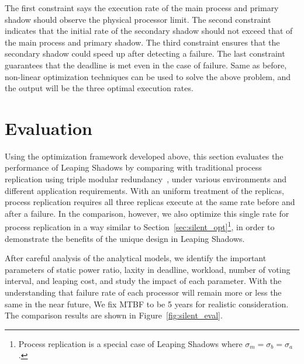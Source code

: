The first constraint says the execution rate of the main process and primary shadow should observe the physical processor limit. The second constraint indicates that the initial rate of the secondary shadow should not exceed that of the main process and primary shadow. The third constraint ensures that the secondary shadow could speed up after detecting a failure. The last constraint guarantees that the deadline is met even in the case of failure. Same as before, non-linear optimization techniques can be used to solve the above problem, and the output will be the three optimal execution rates.

\section{Evaluation}
Using the optimization framework developed above, this section evaluates the performance of Leaping Shadows by comparing with traditional process replication using triple modular redundancy~\cite{fiala_2012_sdc}, under various environments and different application requirements. With an uniform treatment of the replicas, process replication requires all three replicas execute at the same rate before and after a failure. In the comparison, however, we also optimize this single rate for process replication in a way similar to Section~\ref{sec:silent_opt}\footnote{Process replication is a special case of Leaping Shadows where $\sigma_m = \sigma_b = \sigma_a$.}, in order to demonstrate the benefits of the unique design in Leaping Shadows. 

After careful analysis of the analytical models, we identify the important parameters of static power ratio, laxity in deadline, workload, number of voting interval, and leaping cost, and study the impact of each parameter. With the understanding that failure rate of each processor will remain more or less the same in the near future, We fix MTBF to be 5 years for realistic consideration. %
The comparison results are shown in Figure~\ref{fig:silent_eval}.

